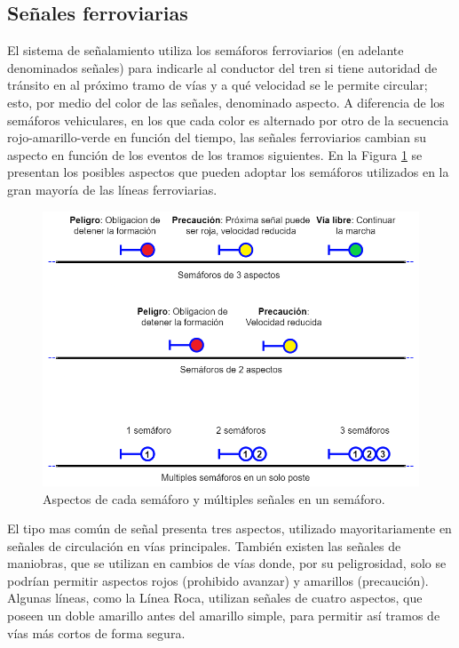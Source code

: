 \subsection{Señales ferroviarias}
    \label{sec:signals}
    
    El sistema de señalamiento utiliza los semáforos ferroviarios (en adelante denominados señales) para indicarle al conductor del tren si tiene autoridad de tránsito en al próximo tramo de vías y a qué velocidad se le permite circular; esto, por medio del color de las señales, denominado aspecto. A diferencia de los semáforos vehiculares, en los que cada color es alternado por otro de la secuencia rojo-amarillo-verde en función del tiempo, las señales ferroviarios cambian su aspecto en función de los eventos de los tramos siguientes. En la Figura \ref{fig:signal_1} se presentan los posibles aspectos que pueden adoptar los semáforos utilizados en la gran mayoría de las líneas ferroviarias.

    \begin{figure}[!h]
        \centering
        \includegraphics[width=1\textwidth]{Figuras/Semaforo3.png}
        \centering\caption{Aspectos de cada semáforo y múltiples señales en un semáforo.}
        \label{fig:signal_1}
    \end{figure}

    El tipo mas común de señal presenta tres aspectos, utilizado mayoritariamente en señales de circulación en vías principales. También existen las señales de maniobras, que se utilizan en cambios de vías donde, por su peligrosidad, solo se podrían permitir aspectos rojos (prohibido avanzar) y amarillos (precaución). Algunas líneas, como la Línea Roca, utilizan señales de cuatro aspectos, que poseen un doble amarillo antes del amarillo simple, para permitir así tramos de vías más cortos de forma segura.

